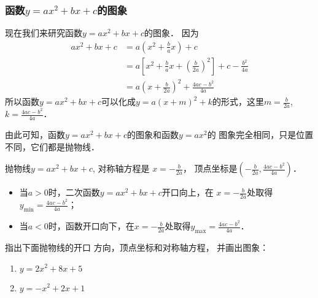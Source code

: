 \subsubsection{函数$y=ax^2+bx+c$的图象}
现在我们来研究函数$y=ax^2+bx+c$的图象．
因为
\[\begin{split}
ax^2+bx+c&=a\left(x^2+\frac{b}{a}x\right)+c\\
&=a\left[x^2+\frac{b}{a}x+\left(\frac{b}{2a}\right)^2\right]+c-\frac{b^2}{4a}\\
&=a\left(x+\frac{b}{2a}\right)^2+\frac{4ac-b^2}{4a}
\end{split}\]    
所以函数$y=ax^2+bx+c$可以化成$y=a(x+m)^2+k$的形式，这里$m=\frac{b}{2a}$, $k=\frac{4ac-b^2}{4a}$．

由此可知，函数$y=ax^2+bx+c$的图象和函数$y=ax^2$的
图象完全相同，只是位置不同，它们都是抛物线．

抛物线$y=ax^2+bx+c$, 对称轴方程是
$x=-\frac{b}{2a}$，
顶点坐标是$\left(-\frac{b}{2a},\frac{4ac-b^2}{4a}\right)$．
\begin{itemize}
    \item 当$a>0$时，二次函数$y=ax^2+bx+c$开口向上，在
$x=-\frac{b}{2a}$处取得$y_{\min}=\frac{4ac-b^2}{4a}$；
\item 当$a<0$时，函数开口向下，在$x=-\frac{b}{2a}$处取得$y_{\max}=\frac{4ac-b^2}{4a}$．
\end{itemize}

\begin{example}
    指出下面抛物线的开口
方向，顶点坐标和对称轴方程，
并画出图象：
\begin{multicols}{2}
\begin{enumerate}
    \item $y=2x^2+8x+5$
    \item $y=-x^2+2x+1$
\end{enumerate}
\end{multicols}
\end{example}

